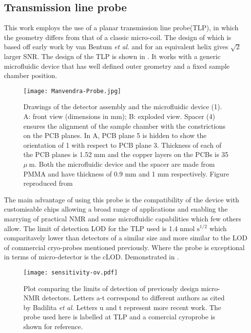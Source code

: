 \subsection{Transmission line probe}

This work employs the use of a planar transmission line probe(TLP)\citep{Finch:2016gv, RN164}, in which the geometry
differs from that of a classic micro-coil. The design of which is based off early work by van Bentum \textit{et
al.} and for an equivalent helix gives $\sqrt{2}$ larger SNR\citep{vanBentum:2007fda}. The design of the TLP is shown in
. It works with a generic microfluidic device that has well defined outer geometry and a fixed sample
chamber position.
\begin{figure}
  \begin{center}
  \texttt{[image: Manvendra-Probe.jpg]}
  \end{center}
  \caption{Drawings of the detector assembly and the microfluidic device (1). A: front view (dimensions in mm); B:
  exploded view. Spacer (4) ensures the alignment of the sample chamber with the constrictions on the PCB planes. In A,
  PCB plane 5 is hidden to show the orientation of 1 with respect to PCB plane 3. Thickness of each of the PCB planes
  is 1.52 mm and the copper layers on the PCBs is 35 $\mu~\text{m}$. Both the microfluidic device and the spacer are made from
  PMMA and have thickness of 0.9 mm and 1 mm respectively. Figure reproduced from\citep{RN164}}
  \label{fig:MVProbe}
\end{figure}
The main advantage of using this probe is the compatibility of the device with customisable chips allowing
a broad range of applications and enabling the marrying of practical NMR and some microfluidic capabilities which
few others allow\citep{RN165,RN166,RN167}. The limit of detection LOD for the TLP used is
1.4 nmol $\text{s}^{1/2}$ which comparitavely lower than detectors of a similar size and more similar to the LOD of
commercial cryo-probes mentioned previously. Where the probe is exceptional in terms of micro-detector is
the cLOD. Demonstrated in .
\begin{figure}
  \texttt{[image: sensitivity-ov.pdf]}
  \caption{Plot comparing the limits of detection of previously design micro-NMR detectors. Letters
  a-t correspond to different authors as cited by Badilita \textit{et al.}\citep{Badilita:2011td} Letters u\citep{Meier:2014ds}
  and t\citep{RN165} represent more recent work. The probe used here is labelled at TLP and a comercial cyroprobe is shown for reference.}
  \label{fig:cLOD}
\end{figure}

